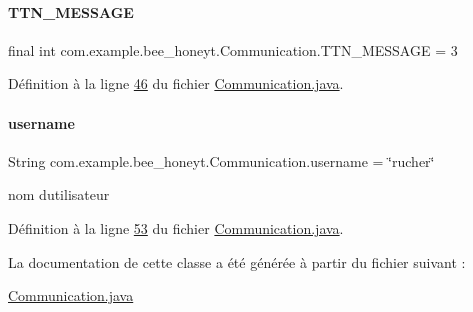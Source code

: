 \mbox{\label{classcom_1_1example_1_1bee__honeyt_1_1_communication_aa81848662846946c92ee2b1380669c66}} 
\paragraph{\texorpdfstring{T\+T\+N\+\_\+\+M\+E\+S\+S\+A\+GE}{TTN\_MESSAGE}}
{\footnotesize\ttfamily final int com.\+example.\+bee\+\_\+honeyt.\+Communication.\+T\+T\+N\+\_\+\+M\+E\+S\+S\+A\+GE = 3\hspace{0.3cm}{\ttfamily [static]}}



Définition à la ligne \hyperlink{_communication_8java_source_l00046}{46} du fichier \hyperlink{_communication_8java_source}{Communication.\+java}.

\mbox{\label{classcom_1_1example_1_1bee__honeyt_1_1_communication_abfc9c112404b1ddf0fa90587201d5a8f}} 
\paragraph{\texorpdfstring{username}{username}}
{\footnotesize\ttfamily String com.\+example.\+bee\+\_\+honeyt.\+Communication.\+username = \char`\"{}rucher\char`\"{}\hspace{0.3cm}{\ttfamily [private]}}



nom d\textquotesingle{}utilisateur 



Définition à la ligne \hyperlink{_communication_8java_source_l00053}{53} du fichier \hyperlink{_communication_8java_source}{Communication.\+java}.



La documentation de cette classe a été générée à partir du fichier suivant \+:\begin{DoxyCompactItemize}
\item 
\hyperlink{_communication_8java}{Communication.\+java}\end{DoxyCompactItemize}
